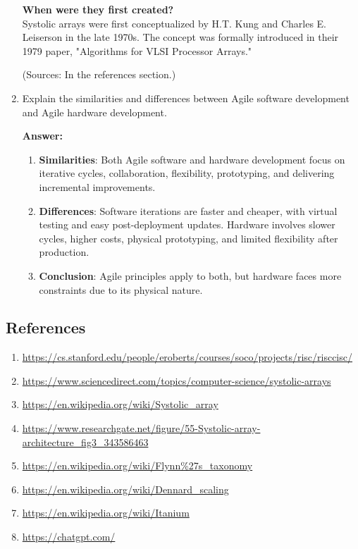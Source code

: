 \documentclass[a4paper,12pt]{article}
\begin{document}
\begin{enumerate}
    \newpage

    \textbf{When were they first created? }\\
    Systolic arrays were first conceptualized by H.T. Kung and Charles E. Leiserson in the late 1970s. The concept was formally introduced in their 1979 paper, "Algorithms for VLSI Processor Arrays."

    (Sources: In the references section.)

    \item Explain the similarities and differences between Agile software development and Agile hardware development.

    \textbf{Answer:}
    \begin{enumerate}
        \item \textbf{Similarities}: Both Agile software and hardware development focus on iterative cycles, collaboration, flexibility, prototyping, and delivering incremental improvements.

        \item \textbf{Differences}: Software iterations are faster and cheaper, with virtual testing and easy post-deployment updates. Hardware involves slower cycles, higher costs, physical prototyping, and limited flexibility after production.

        \item \textbf{Conclusion}: Agile principles apply to both, but hardware faces more constraints due to its physical nature.
    \end{enumerate}

\end{enumerate}

\subsection*{References}

\begin{enumerate}
    \sloppy
    \item \url{https://cs.stanford.edu/people/eroberts/courses/soco/projects/risc/risccisc/}
    \item \url{https://www.sciencedirect.com/topics/computer-science/systolic-arrays}
    \item \url{https://en.wikipedia.org/wiki/Systolic_array}
    \item \url{https://www.researchgate.net/figure/55-Systolic-array-architecture_fig3_343586463}
    \item \url{https://en.wikipedia.org/wiki/Flynn%27s_taxonomy}
    \item \url{https://en.wikipedia.org/wiki/Dennard_scaling}
    \item \url{https://en.wikipedia.org/wiki/Itanium}
    \item \url{https://chatgpt.com/}
\end{enumerate}
\end{document}
